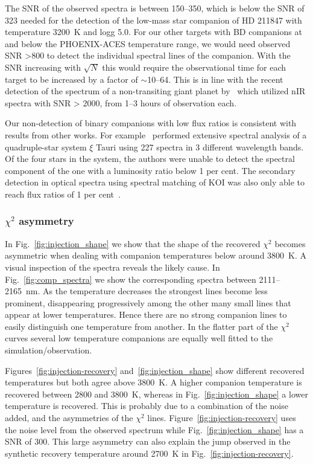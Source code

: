 \documentclass[fleqn,usenatbib]{mnras}
\newcommand*\bl{\color{blue}}
\begin{document}
    The SNR of the observed spectra is between 150--350, which is below the SNR of 323 needed for the detection of the low-mass star companion of {HD 211847} with temperature 3200~K and logg 5.0. For our other targets with BD companions at and below the PHOENIX-ACES temperature range, we would need observed SNR >800 to detect the individual spectral lines of the companion. With the SNR increasing with \(\sqrt{N}\) this would require the observational time for each target to be increased by a factor of \(\sim\)10--64.
    {\bl This is in line with the recent detection of the spectrum of a non-transiting giant planet by~\citet{piskorz_evidence_2016} which utilized nIR spectra with SNR > 2000, from 1--3 hours of observation each.}
    
    Our non-detection of binary companions with low flux ratios is consistent with results from other works. For example~\citet{nemravova_xtauri_2016} performed extensive spectral analysis of a quadruple-star system {$\xi$ Tauri} using 227 spectra in 3 different wavelength bands. Of the four stars in the system, the authors were unable to detect the spectral component of the one with a luminosity ratio below 1 per cent. {\bl The secondary detection in optical spectra using spectral matching of KOI was also only able to reach flux ratios of 1 per cent~\citet{kolbl_detection_2015}.}
    
    
    
    \subsubsection{\(\chi^2\) asymmetry}
    \label{subsubsec:chi2_assymetry}
    In Fig.~\ref{fig:injection_shape} we show that the shape of the recovered \(\chi^2\) becomes asymmetric when dealing with companion temperatures below around 3800~K. A visual inspection of the spectra reveals the likely cause. In Fig.~\ref{fig:comp_spectra} we show the corresponding spectra between 2111--2165~nm. As the temperature decreases the strongest lines become less prominent, disappearing progressively among the other many small lines that appear at lower temperatures. Hence there are no strong companion lines to easily distinguish one temperature from another. In the flatter part of the \(\chi^2\) curves several low temperature companions are equally well fitted to the simulation/observation.
    
    Figures~\ref{fig:injection-recovery} and~\ref{fig:injection_shape} show different recovered temperatures but both agree above 3800~K. A higher companion temperature is recovered between 2800 and 3800~K, whereas in Fig.~\ref{fig:injection_shape} a lower temperature is recovered. This is probably due to a combination of the noise added, and the asymmetries of the \(\chi^2\) lines. Figure~\ref{fig:injection-recovery} uses the noise level from the observed spectrum while Fig.~\ref{fig:injection_shape} has a SNR of 300.
    This large asymmetry can also explain the jump observed in the synthetic recovery temperature around 2700~K in Fig.~\ref{fig:injection-recovery}.
    
\end{document}
